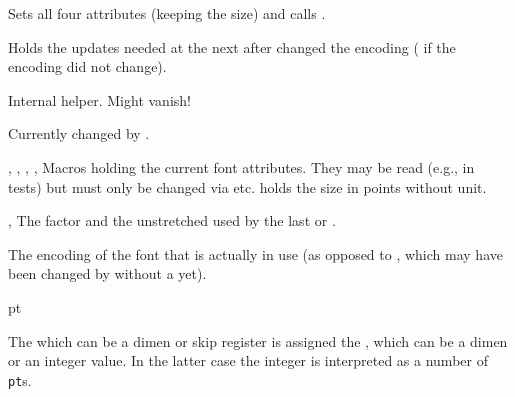 \documentclass{l3in2edoc}
\begin{document}
\begin{function}[user]
  {
    \usefont
  }
  \begin{syntax}
        
  \end{syntax}
  Sets all four attributes (keeping the size) and calls
  .
\end{function}



\begin{function}[]
  {
    \enc@update
  }
  Holds the updates needed at the next  after
   changed the encoding ( if the encoding
  did not change).
\end{function}





\begin{function}[int]
  {
    \@@enc@update
  }
  Internal helper. Might vanish!

  Currently changed by .
\end{function}




\begin{variable}[]
  {
    \f@encoding,
    \f@family,
    \f@series,
    \f@shape,
    \f@size
  }
  Macros holding the current font attributes. They may be read (e.g.,
  in tests) but must only be changed via  etc.
   holds the size in points without unit.
\end{variable}




\begin{variable}[]
  {
    \f@linespread,
    \f@baselineskip
  }
  The  factor and the unstretched
   used by the last  or
  .
\end{variable}



\begin{variable}[]
  {
    \cf@encoding
  }
  The encoding of the font that is actually in use (as opposed to
  , which may have been changed by 
  without a  yet).
\end{variable}



\begin{function}[]
  {
    \@defaultunits
  }
  \begin{syntax}
       pt
  \end{syntax}
  The  which can be a dimen or skip register is
  assigned the , which can be a dimen or an integer
  value. In the latter case the integer is interpreted as a number of
  \texttt{pt}s.
\end{function}
\end{document}
